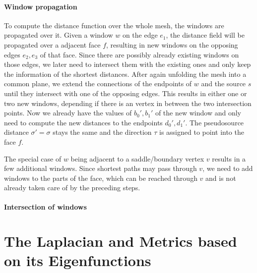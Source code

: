 \paragraph{Window propagation}
To compute the distance function over the whole mesh, the windows are propagated over it.
Given a window $w$ on the edge $e_1$, the distance field will be propagated over a adjacent face $f$, resulting in new windows on the opposing edges $e_2,e_3$ of that face.
Since there are possibly already existing windows on those edges, we later need to intersect them with the existing ones and only keep the information of the shortest distances.
After again unfolding the mesh into a common plane, we extend the connections of the endpoints of $w$ and the source $s$ until they intersect with one of the opposing edges.
This results in either one or two new windows, depending if there is an vertex in between the two intersection points.
Now we already have the values of $ b_0', b_1'$ of the new window and only need to compute the new distances to the endpoints $d_0',d_1'$.
The pseudosource distance $\sigma' = \sigma$ stays the same and the direction $\tau$ is assigned to point into the face $f$.

The special case of $w$ being adjacent to a saddle/boundary vertex $v$ results in a few additional windows.
Since shortest paths may pass through $v$, we need to add windows to the parts of the face, which can be reached through $v$ and is not already taken care of by the preceding steps.

\paragraph{Intersection of windows}

\cite{surazhsky2005fast}

\section{The Laplacian and Metrics based on its Eigenfunctions}
